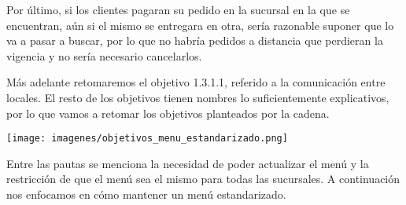 \documentclass[a4paper,10pt]{article}
\begin{document}
Por último, si los clientes pagaran su pedido en la sucursal en la que se encuentran, aún si el mismo se entregara en otra, sería razonable suponer que lo va a pasar a buscar, por lo que no habría pedidos a distancia que perdieran la vigencia y no sería necesario cancelarlos.

Más adelante retomaremos el objetivo 1.3.1.1, referido a la comunicación entre locales.
El resto de los objetivos tienen nombres lo suficientemente explicativos, por lo que vamos a retomar los objetivos planteados por la cadena.



\texttt{[image: imagenes/objetivos\_menu\_estandarizado.png]}

Entre las pautas se menciona la necesidad de poder actualizar el menú y la restricción de que el menú sea el mismo para todas las sucursales. A continuación nos enfocamos en cómo mantener un menú estandarizado.
\end{document}
